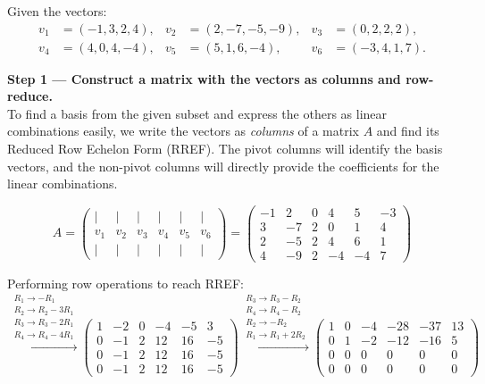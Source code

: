 \documentclass[12pt,a3paper]{article}
\begin{document}
\begin{tcolorbox}[enhanced,breakable,colback=cC!4,colframe=cC,
  boxrule=0.8pt,arc=5pt,
  title={\textbf{Answer --- Basis, Linear Combinations \& Coordinate Vectors}},
  fonttitle=\bfseries\color{white},colbacktitle=cC]

Given the vectors:
\begin{align*}
v_1&=(-1,3,2,4), & v_2&=(2,-7,-5,-9), & v_3&=(0,2,2,2), \\
v_4&=(4,0,4,-4), & v_5&=(5,1,6,-4), & v_6&=(-3,4,1,7).
\end{align*}

\textbf{Step 1 --- Construct a matrix with the vectors as columns and row-reduce.} \\
To find a basis from the given subset and express the others as linear combinations easily, we write the vectors as \textit{columns} of a matrix $A$ and find its Reduced Row Echelon Form (RREF). The pivot columns will identify the basis vectors, and the non-pivot columns will directly provide the coefficients for the linear combinations.

\[
A = \begin{pmatrix}
| & | & | & | & | & | \\
v_1 & v_2 & v_3 & v_4 & v_5 & v_6 \\
| & | & | & | & | & | 
\end{pmatrix}
= \begin{pmatrix}
-1 & 2 & 0 & 4 & 5 & -3 \\
3 & -7 & 2 & 0 & 1 & 4 \\
2 & -5 & 2 & 4 & 6 & 1 \\
4 & -9 & 2 & -4 & -4 & 7
\end{pmatrix}
\]

Performing row operations to reach RREF:
\[
\xrightarrow{\substack{R_1 \to -R_1 \\ R_2 \to R_2-3R_1 \\ R_3 \to R_3-2R_1 \\ R_4 \to R_4-4R_1}}
\begin{pmatrix}
1 & -2 & 0 & -4 & -5 & 3 \\
0 & -1 & 2 & 12 & 16 & -5 \\
0 & -1 & 2 & 12 & 16 & -5 \\
0 & -1 & 2 & 12 & 16 & -5
\end{pmatrix}
\xrightarrow{\substack{R_3 \to R_3-R_2 \\ R_4 \to R_4-R_2 \\ R_2 \to -R_2 \\ R_1 \to R_1+2R_2}}
\begin{pmatrix}
1 & 0 & -4 & -28 & -37 & 13 \\
0 & 1 & -2 & -12 & -16 & 5 \\
0 & 0 & 0 & 0 & 0 & 0 \\
0 & 0 & 0 & 0 & 0 & 0
\end{pmatrix}
\]


\end{tcolorbox}
\end{document}
